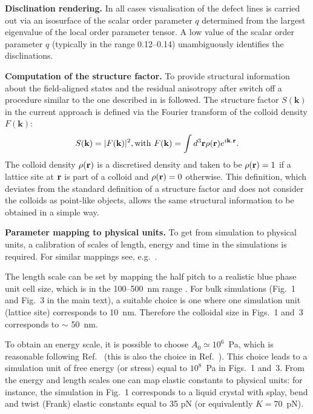 \documentclass[12pt,twoside]{article}
\begin{document}
\noindent
\textbf{Disclination rendering.}
In all cases visualisation of the defect lines is carried out via
an isosurface of the scalar order parameter $q$ determined from the
largest eigenvalue of the local order parameter tensor. A low value
of the scalar order parameter $q$ (typically in the range 0.12--0.14)
unambiguously identifies the disclinations.

\noindent
\textbf{Computation of the structure factor.}
To provide structural information about the field-aligned 
states and the residual anisotropy after switch off a 
procedure similar to the one described in \cite{oliver-bp3} is
followed.
The structure factor $S(\mathbf{k})$ in the current approach is
defined via the Fourier transform of the colloid density $F(\mathbf{k})$:
\begin{equation}
S({\bf k}) =  |F({\bf k})|^2, \mathrm{with}\
F({\bf k}) = \int d^3{\bf r} \rho({\bf r}) e^{i {\bf k. r}}.
\end{equation}
The colloid density $\rho({\bf r})$ is a discretised density and taken to be
$\rho({\bf r})=1$ if a lattice site at ${\bf r}$ is part of a colloid
and $\rho({\bf r})=0$ otherwise. This definition, which deviates from the 
standard definition of a structure factor and does not consider the colloids 
as point-like objects, allows the same structural information
to be obtained in a simple way.

\noindent
\textbf{Parameter mapping to physical units.}
To get from simulation to physical units, a calibration of scales of
length, energy and time in the simulations is required. For similar
mappings see,
e.g.~\cite{denniston2}.

The length scale can be set by mapping the half pitch to a realistic blue
phase unit cell size, which is in the 100--500~nm range \cite{blue1}. 
For bulk simulations (Fig.~1 and Fig.~3 in the main text), a suitable choice
is one where one simulation unit (lattice site) corresponds to 10~nm. Therefore
the colloidal size in Figs.~1 and~3 corresponds to $\sim$ 50~nm. 

To obtain an energy scale, it is possible to choose $A_0 \simeq 10^6$~Pa,
which is reasonable following Ref.~\cite{blue1} (this is also the choice in
Ref.~\cite{oliver2}). This choice leads to a simulation unit of
free energy (or stress) equal to $10^{8}$~Pa in Figs.~1 and~3.
From the energy and length scales one can map elastic constants to
physical units: for instance, the simulation in Fig.~1 corresponds to
a liquid crystal with splay, bend and twist (Frank) elastic constants
equal to 35 pN (or equivalently $K=70$~pN).
\end{document}

